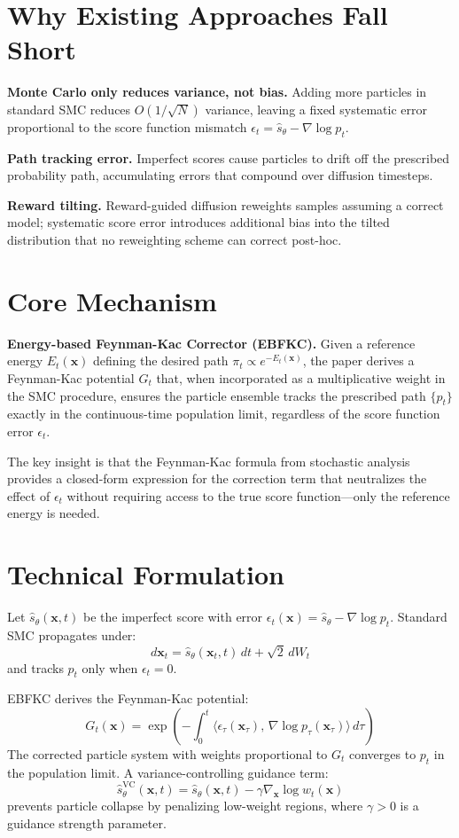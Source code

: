 \documentclass[10pt,twocolumn]{article}
\begin{document}
\section{Why Existing Approaches Fall Short}

\textbf{Monte Carlo only reduces variance, not bias.} Adding more particles in standard
SMC reduces $O(1/\sqrt{N})$ variance, leaving a fixed systematic error proportional
to the score function mismatch $\epsilon_t = \hat{s}_\theta - \nabla\log p_t$.

\textbf{Path tracking error.} Imperfect scores cause particles to drift off the
prescribed probability path, accumulating errors that compound over diffusion timesteps.

\textbf{Reward tilting.} Reward-guided diffusion reweights samples assuming a correct
model; systematic score error introduces additional bias into the tilted distribution
that no reweighting scheme can correct post-hoc.

\section{Core Mechanism}

\textbf{Energy-based Feynman-Kac Corrector (EBFKC).}
Given a reference energy $E_t(\mathbf{x})$ defining the desired path $\pi_t \propto e^{-E_t(\mathbf{x})}$,
the paper derives a Feynman-Kac potential $G_t$ that, when incorporated as a
multiplicative weight in the SMC procedure, ensures the particle ensemble tracks
the prescribed path $\{p_t\}$ exactly in the continuous-time population limit,
regardless of the score function error $\epsilon_t$.

The key insight is that the Feynman-Kac formula from stochastic analysis provides a
closed-form expression for the correction term that neutralizes the effect of
$\epsilon_t$ without requiring access to the true score function---only the reference
energy is needed.

\section{Technical Formulation}

Let $\hat{s}_\theta(\mathbf{x},t)$ be the imperfect score with error
$\epsilon_t(\mathbf{x}) = \hat{s}_\theta - \nabla\log p_t$.
Standard SMC propagates under:
\[
d\mathbf{x}_t = \hat{s}_\theta(\mathbf{x}_t,t)\,dt + \sqrt{2}\,dW_t
\]
and tracks $p_t$ only when $\epsilon_t = 0$.

EBFKC derives the Feynman-Kac potential:
\[
G_t(\mathbf{x}) = \exp\!\left(-\int_0^t \bigl\langle \epsilon_\tau(\mathbf{x}_\tau),\,
  \nabla\log p_\tau(\mathbf{x}_\tau)\bigr\rangle \, d\tau\right)
\]
The corrected particle system with weights proportional to $G_t$ converges to $p_t$
in the population limit. A variance-controlling guidance term:
\[
\hat{s}_\theta^{\text{VC}}(\mathbf{x},t) = \hat{s}_\theta(\mathbf{x},t)
  - \gamma \nabla_{\mathbf{x}} \log w_t(\mathbf{x})
\]
prevents particle collapse by penalizing low-weight regions, where $\gamma > 0$
is a guidance strength parameter.
\end{document}

